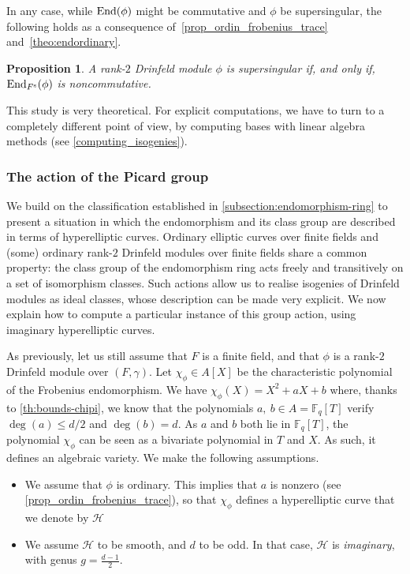 \documentclass[11pt]{article}
\newtheorem{proposition}[theorem]{Proposition}
\theoremstyle{definition}
\newcommand\Fq{\mathbb{F}_q}
\newcommand\End{\text{\rm End}}
\renewcommand{\H}{\mathcal H}
\newcommand{\Fs}{F^{\text{\rm s}}}
\begin{document}
In any case, while $\End(\phi)$ might be commutative and $\phi$ be supersingular, the following holds as a consequence of~\cref{prop_ordin_frobenius_trace} and~\cref{theo:endordinary}.

\begin{proposition}
  A rank-$2$ Drinfeld module $\phi$ is supersingular if, and only if,
  $\End_{\Fs}(\phi)$ is noncommutative.
\end{proposition}

This study is very theoretical. For explicit computations, we have to turn to a
completely different point of view, by computing bases with linear algebra
methods (see \cref{computing_isogenies}).

\subsubsection{The action of the Picard group} %
\label{computing-group-action}

We build on the classification established in
\cref{subsection:endomorphism-ring} to present a situation in which the
endomorphism and its class group are described in terms of hyperelliptic
curves.
Ordinary elliptic curves over finite fields and (some) ordinary rank-$2$ Drinfeld
modules over finite fields share a common property: the class group of the
endomorphism ring acts freely and transitively on a set of isomorphism classes. Such
actions allow us to realise isogenies of Drinfeld modules as ideal classes, whose
description can be made very explicit. We now explain how to compute a
particular instance of this group action, using imaginary hyperelliptic curves.

As previously, let us still assume that $F$ is a finite field, and that $\phi$ is a rank-$2$ Drinfeld module over
$(F, \gamma)$. Let $\chi_\phi \in A[X]$ be the characteristic
 polynomial of the Frobenius endomorphism. We have $\chi_{\phi}(X) = X^2 + aX + b$
where, thanks to \cref{th:bounds-chipi}, we know that the polynomials 
$a, \: b \in A=\Fq[T]$ verify $\deg(a) \leqslant d/2$ and $\deg(b) = d$.
As $a$ and $b$ both lie in $\Fq[T]$, the polynomial $\chi_{\phi}$ can be seen as a bivariate
polynomial in $T$ and $X$. As such, it defines an algebraic variety. We make the
following assumptions.

\begin{itemize}
  \item We assume that $\phi$ is ordinary. This implies that $a$ is nonzero
    (see \cref{prop_ordin_frobenius_trace}), so that $\chi_{\phi}$
    defines a hyperelliptic curve that we denote by $\H$%
  \item We assume $\H$ to be smooth, and $d$ to be odd. In that case, $\H$ is
    \emph{imaginary}, with genus $g = \frac{d-1}{2}$.
\end{itemize}
\end{document}
